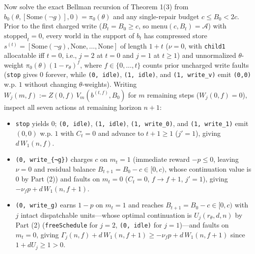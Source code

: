 \documentclass[11pt,a4paper]{article}
\providecommand{\tightlist}{\setlength{\itemsep}{2pt}\setlength{\parskip}{0pt}}
\begin{document}
Now solve the exact Bellman recursion of Theorem 1(3) from
\(b_0(\theta, [\mathrm{Some}(\neg g)], 0) = \pi_0(\theta)\) and any
single-repair budget \(c \le B_0 < 2c\). Prior to the first charged
write (\(B_t = B_0 \ge c\), so \(\mathrm{menu}(c, B_t) = \mathcal{A}\))
with \(\mathrm{stopped}_t = 0\), every world in the support of \(b_t\)
has compressed store
\(s^{(t)} = [\mathrm{Some}(\neg g), \mathrm{None}, \dots, \mathrm{None}]\)
of length \(1 + t\) (\(\nu = 0\), with \texttt{child1} allocatable iff
\(t = 0\), i.e., \(j = 2\) at \(t=0\) and \(j = 1\) at \(t \ge 1\)) and
unnormalized \(\theta\)-weight \(\pi_0(\theta)(1 - r_\theta)^f\), where
\(f \in \{0, \dots, t\}\) counts prior uncharged write faults
(\texttt{stop} gives \(0\) forever, while \texttt{(0,\ idle)},
\texttt{(1,\ idle)}, and \texttt{(1,\ write\_v)} emit \texttt{(0,0)}
w.p. \(1\) without changing \(\theta\)-weights). Writing
\(W_j(m, f) := Z(0, f)\,V_m(b^{(t,f)}, B_0)\) for \(m\) remaining steps
(\(W_j(0, f) = 0\)), inspect all seven actions at remaining horizon
\(n + 1\):

\begin{itemize}
\tightlist
\item
  \texttt{stop} yields \(0\); \texttt{(0,\ idle)}, \texttt{(1,\ idle)},
  \texttt{(1,\ write\_0)}, and \texttt{(1,\ write\_1)} emit \((0,0)\)
  w.p. \(1\) with \(C_t = 0\) and advance to \(t + 1 \ge 1\)
  (\(j' = 1\)), giving \(d\,W_1(n, f)\).
\item
  \texttt{(0,\ write\_\{¬g\})} charges \(c\) on \(m_t = 1\) (immediate
  reward \(-p \le 0\), leaving \(\nu = 0\) and residual balance
  \(B_{t+1} = B_0 - c \in [0, c)\), whose continuation value is \(0\) by
  Part (2)) and faults on \(m_t = 0\) (\(C_t = 0\), \(f \to f+1\),
  \(j' = 1\)), giving \(-\nu_f p + d\,W_1(n, f+1)\).
\item
  \texttt{(0,\ write\_g)} earns \(1 - p\) on \(m_t = 1\) and reaches
  \(B_{t+1} = B_0 - c \in [0, c)\) with \(j\) intact dispatchable
  units---whose optimal continuation is \(U_j(r_\theta, d, n)\) by Part
  (2) (\texttt{freeSchedule} for \(j=2\), \texttt{(0,\ idle)} for
  \(j=1\))---and faults on \(m_t = 0\), giving
  \(\Gamma_j(n, f) + d\,W_1(n, f+1) \ge -\nu_f p + d\,W_1(n, f+1)\)
  since \(1 + d U_j \ge 1 > 0\).
\end{itemize}
\end{document}
